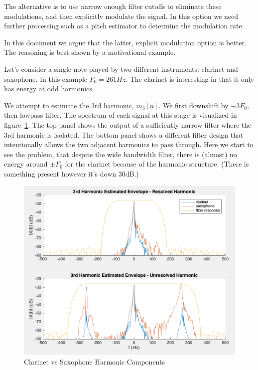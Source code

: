 \documentclass [11pt, proquest] {uwthesis}[2015/03/03]
\begin{document}
The alternative is to use narrow enough filter cutoffs to eliminate these modulations, and then explicitly modulate the signal.  In this option we need further processing such as a pitch estimator to determine the modulation rate.

In this document we argue that the latter, explicit modulation option is better.  The reasoning is best shown by a motivational example.

Let's consider a single note played by two different instruments: clarinet and saxophone.  In this example $F_0 = 261Hz$.  The clarinet is interesting in that it only has energy at odd harmonics.

We attempt to estimate the 3rd harmonic, $m_3[n]$.  We first downshift by $-3F_0$, then lowpass filter.  The spectrum of each signal at this stage is visualized in figure~\ref{fig:clarinetVSsax_F}.  The top panel shows the output of a sufficiently narrow filter where the 3rd harmonic is isolated.  The bottom panel shows a different filter design that intentionally allows the two adjacent harmonics to pass through.  Here we start to see the problem, that despite the wide bandwidth filter, there is (almost) no energy around $\pm F_0$ for the clarinet because of the harmonic structure.  (There is something present however it's down 30dB.)

\begin{figure}[!ht]
  \centering
    \includegraphics[width=1\textwidth]{clarinetVSsax_F}
    \caption{Clarinet vs Saxophone Harmonic Components}\label{fig:clarinetVSsax_F}
\end{figure}
\end{document}

